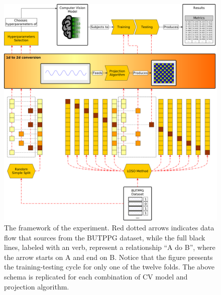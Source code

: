 \begin{figure}
	\includegraphics[width=\textwidth]{img/framework.png}
	\caption{The framework of the experiment. Red dotted arrows indicates data flow that sources from the \acrlong{BUTPPG} dataset, while the full black lines, labeled with an verb, represent a relationship ``A do B'', where the arrow starts on A and end on B. Notice that the figure presents the training-testing cycle for only one of the twelve folds. The above schema is replicated for each combination of \acrlong{CV} model and projection algorithm.}
	\label{fig:framework}
\end{figure}
